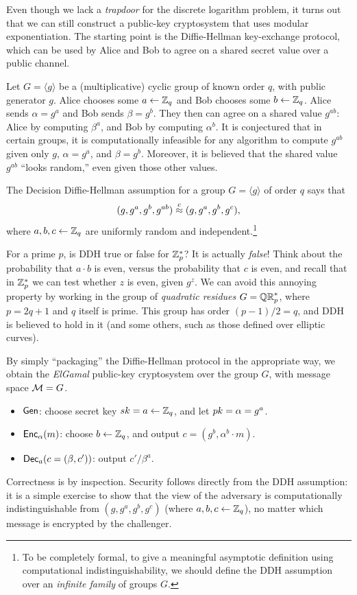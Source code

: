 \documentclass[11pt]{article}
\begin{document}
Even though we lack a \emph{trapdoor} for the discrete logarithm
problem, it turns out that we can still construct a public-key
cryptosystem that uses modular exponentiation.  The starting point is
the Diffie-Hellman key-exchange protocol, which can be used by Alice
and Bob to agree on a shared secret value over a public channel.

Let $G = \langle g \rangle$ be a (multiplicative) cyclic group of
known order $q$, with public generator $g$.  Alice chooses some $a
\gets \mathbb{Z}_q$ and Bob chooses some $b \gets \mathbb{Z}_q$.  Alice sends $\alpha =
g^{a}$ and Bob sends $\beta = g^{b}$.  They then can agree on a shared
value $g^{ab}$: Alice by computing $\beta^{a}$, and Bob by computing
$\alpha^{b}$.  It is conjectured that in certain groups, it is
computationally infeasible for any algorithm to compute $g^{ab}$ given
only $g$, $\alpha = g^{a}$, and $\beta = g^{b}$.  Moreover, it is
believed that the shared value $g^{ab}$ ``looks random,'' even given
those other values.

\begin{conjecture}
  The Decision Diffie-Hellman assumption for a group $G = \langle g
  \rangle$ of order $q$ says that
  \[ (g, g^{a}, g^{b}, g^{ab}) \stackrel{c}{\approx} (g, g^{a}, g^{b}, g^{c}), \]
  where $a, b, c \gets \mathbb{Z}_q$ are uniformly random and
  independent.\footnote{To be completely formal, to give a meaningful
    asymptotic definition using computational indistinguishability, we
    should define the DDH assumption over an \emph{infinite family} of
    groups $G$.}
\end{conjecture}

For a prime $p$, is DDH true or false for $\mathbb{Z}_p^{*}$?  It is actually
\emph{false}!  Think about the probability that $a \cdot b$ is even,
versus the probability that $c$ is even, and recall that in $\mathbb{Z}_p^{*}$
we can test whether $z$ is even, given $g^{z}$.  We can avoid this
annoying property by working in the group of \emph{quadratic residues}
$G = \mathbb{QR}_{p}^{*}$, where $p=2q+1$ and $q$ itself is prime.  This group
has order $(p-1)/2 = q$, and DDH is believed to hold in it (and some
others, such as those defined over elliptic curves).

By simply ``packaging'' the Diffie-Hellman protocol in the appropriate
way, we obtain the \emph{ElGamal} public-key cryptosystem over the
group $G$, with message space $\mathcal{M} = G$.
\begin{itemize}
\item $\mathsf{Gen}$: choose secret key $sk = a \gets \mathbb{Z}_q$, and let $pk =
  \alpha = g^{a}$.
\item $\mathsf{Enc}_{\alpha}(m)$: choose $b \gets \mathbb{Z}_q$, and output $c =
  (g^{b}, \alpha^{b} \cdot m)$.
\item $\mathsf{Dec}_{a}(c = (\beta, c'))$: output $c' / \beta^{a}$.
\end{itemize}
Correctness is by inspection.  Security follows directly from the DDH
assumption: it is a simple exercise to show that the view of the
adversary is computationally indistinguishable from $(g, g^{a}, g^{b},
g^{c})$ (where $a, b, c \gets \mathbb{Z}_q$), no matter which message is
encrypted by the challenger.
\end{document}
